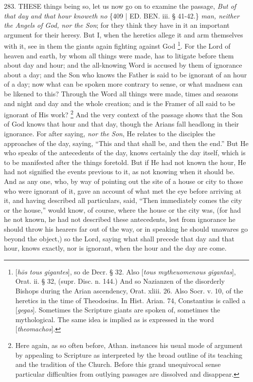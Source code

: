 283. THESE
things being so, let us now go on to examine the passage, \emph{But of
that day and that hour knoweth no} \{409 | ED. BEN.
iii. § 41-42.\} \emph{man, neither the Angels of God, nor the Son};
for they think they have in it an important argument for their heresy.
But I, when the heretics allege it and arm themselves with it, see in
them the giants again fighting against God \footnote{[\emph{h\={o}s tous gigantes}], so de Decr. § 32. Also [\emph{tous
mytheuomenous gigantas}], Orat. ii. § 32, (supr. Disc. n. 144.)
And so Nazianzen of the disorderly Bishops during the Arian ascendency,
Orat. xliii. 26. Also Socr. v. 10, of the heretics in the time of
Theodosius. In Hist. Arian. 74, Constantius is called a [\emph{gegas}].
Sometimes the Scripture giants are spoken of, sometimes the
mythological. The same idea is implied as is expressed in the word [\emph{theomachos}].}. For the Lord of heaven and earth, by whom all things were
made, has to litigate before them about day and hour; and the
all-knowing Word is accused by them of ignorance about a day; and the
Son who knows the Father is said to be ignorant of an hour of a day;
now what can be spoken more contrary to sense, or what madness can be
likened to this? Through the Word all things were made, times and
seasons and night and day and the whole creation; and is the Framer of
all said to be ignorant of His work? \footnote{Here again, as so often before, Athan. instances his usual mode of
argument by appealing to Scripture as interpreted by the broad outline
of its teaching and the tradition of the Church. Before this grand
unequivocal sense particular difficulties from outlying passages are
dissolved and disappear.} And the very context of the passage shows that the Son of God
knows that hour and that day, though the Arians fall headlong in their
ignorance. For after saying, \emph{nor the Son}, He relates to the
disciples the approaches of the day, saying, ``This and that shall be,
and then the end.'' But He who speaks of the antecedents of the day,
knows certainly the day itself, which is to be manifested after the
things foretold. But if He had not known the hour, He had not
signified the events previous to it, as not knowing when it should be.
And as any one, who, by way of pointing out the site of a house or
city to those who were ignorant of it, gave an account of what met the
eye before arriving at it, and having described all particulars, said,
``Then immediately comes the city or the house,'' would know, of
course, where the house or the city was, (for had he not known, he had
not described these antecedents, lest from ignorance he should throw
his hearers far out of the way, or in speaking he should unawares go
beyond the object,) so the Lord, saying what shall precede that day
and that hour, knows exactly, nor is ignorant, when the hour and the
day are come.


